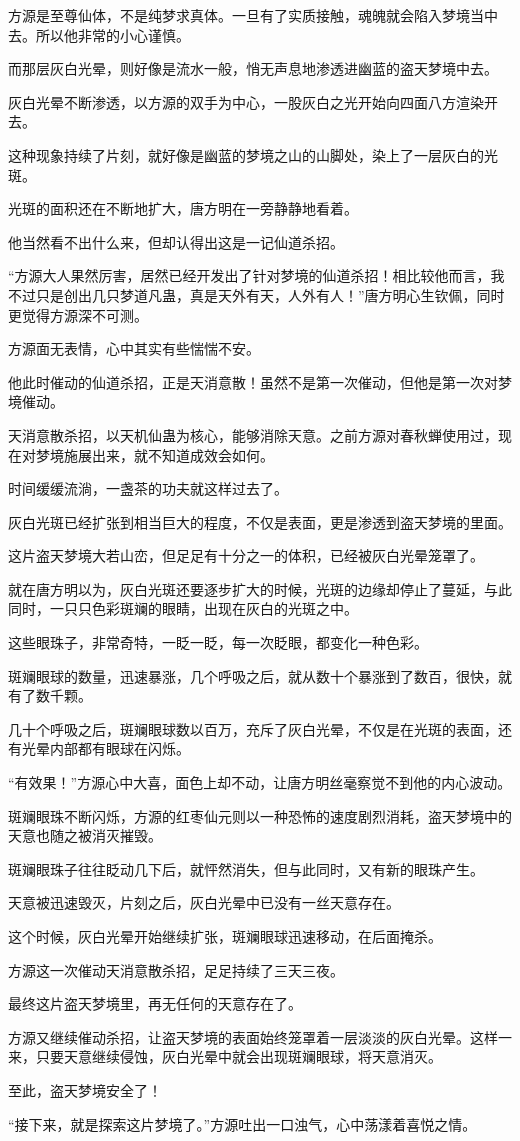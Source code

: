 \begin{this_body}
方源是至尊仙体，不是纯梦求真体。一旦有了实质接触，魂魄就会陷入梦境当中去。所以他非常的小心谨慎。

而那层灰白光晕，则好像是流水一般，悄无声息地渗透进幽蓝的盗天梦境中去。

灰白光晕不断渗透，以方源的双手为中心，一股灰白之光开始向四面八方渲染开去。

这种现象持续了片刻，就好像是幽蓝的梦境之山的山脚处，染上了一层灰白的光斑。

光斑的面积还在不断地扩大，唐方明在一旁静静地看着。

他当然看不出什么来，但却认得出这是一记仙道杀招。

“方源大人果然厉害，居然已经开发出了针对梦境的仙道杀招！相比较他而言，我不过只是创出几只梦道凡蛊，真是天外有天，人外有人！”唐方明心生钦佩，同时更觉得方源深不可测。

方源面无表情，心中其实有些惴惴不安。

他此时催动的仙道杀招，正是天消意散！虽然不是第一次催动，但他是第一次对梦境催动。

天消意散杀招，以天机仙蛊为核心，能够消除天意。之前方源对春秋蝉使用过，现在对梦境施展出来，就不知道成效会如何。

时间缓缓流淌，一盏茶的功夫就这样过去了。

灰白光斑已经扩张到相当巨大的程度，不仅是表面，更是渗透到盗天梦境的里面。

这片盗天梦境大若山峦，但足足有十分之一的体积，已经被灰白光晕笼罩了。

就在唐方明以为，灰白光斑还要逐步扩大的时候，光斑的边缘却停止了蔓延，与此同时，一只只色彩斑斓的眼睛，出现在灰白的光斑之中。

这些眼珠子，非常奇特，一眨一眨，每一次眨眼，都变化一种色彩。

斑斓眼球的数量，迅速暴涨，几个呼吸之后，就从数十个暴涨到了数百，很快，就有了数千颗。

几十个呼吸之后，斑斓眼球数以百万，充斥了灰白光晕，不仅是在光斑的表面，还有光晕内部都有眼球在闪烁。

“有效果！”方源心中大喜，面色上却不动，让唐方明丝毫察觉不到他的内心波动。

斑斓眼珠不断闪烁，方源的红枣仙元则以一种恐怖的速度剧烈消耗，盗天梦境中的天意也随之被消灭摧毁。

斑斓眼珠子往往眨动几下后，就怦然消失，但与此同时，又有新的眼珠产生。

天意被迅速毁灭，片刻之后，灰白光晕中已没有一丝天意存在。

这个时候，灰白光晕开始继续扩张，斑斓眼球迅速移动，在后面掩杀。

方源这一次催动天消意散杀招，足足持续了三天三夜。

最终这片盗天梦境里，再无任何的天意存在了。

方源又继续催动杀招，让盗天梦境的表面始终笼罩着一层淡淡的灰白光晕。这样一来，只要天意继续侵蚀，灰白光晕中就会出现斑斓眼球，将天意消灭。

至此，盗天梦境安全了！

“接下来，就是探索这片梦境了。”方源吐出一口浊气，心中荡漾着喜悦之情。

\end{this_body}

